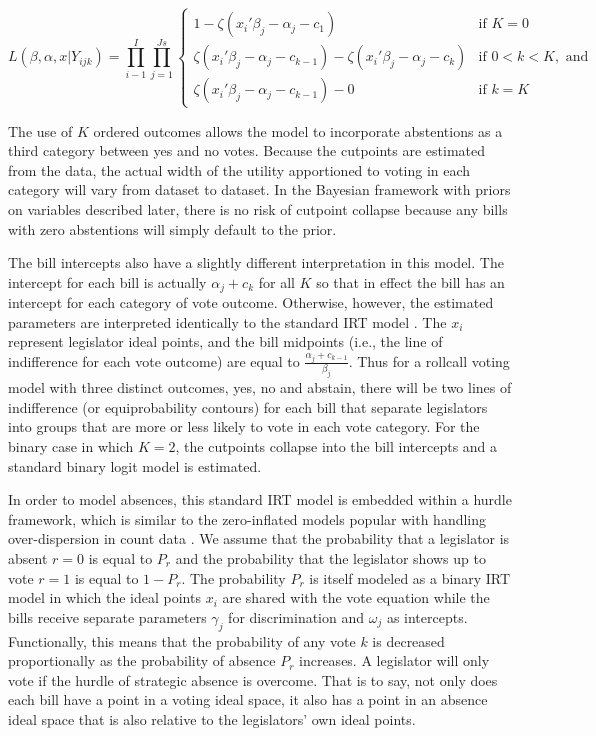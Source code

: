 					\[
	L(\beta,\alpha,x|Y_{ijk}) = \prod_{i-1}^{I} \prod_{j=1}^{Js}
	\begin{cases} 
	1 -  \zeta(x_{i}'\beta_j - \alpha_j - c_1) & \text{if } K = 0 \\
	\zeta(x_{i}'\beta_j - \alpha_j - c_{k-1}) - \zeta(x_{i}'\beta_j - \alpha_j - c_{k})       & \text{if } 0 < k < K, \text{ and} \\
	\zeta(x_{i}'\beta_j - \alpha_j - c_{k-1}) - 0 & \text{if } k=K
	\end{cases}
	\]
	
	The use of $K$ ordered outcomes allows the model to incorporate abstentions as a third category between yes and no votes. Because the cutpoints are estimated from the data, the actual width of the utility apportioned to voting in each category will vary from dataset to dataset. In the Bayesian framework with priors on variables described later, there is no risk of cutpoint collapse because any bills with zero abstentions will simply default to the prior.
	
	The bill intercepts also have a slightly different interpretation in this model. The intercept for each bill is actually $\alpha_j + c_k$ for all $K$ so that in effect the bill has an intercept for each category of vote outcome. Otherwise, however, the estimated parameters are interpreted identically to the standard IRT model \parencite{jackman2004}. The $x_i$ represent legislator ideal points, and the bill midpoints (i.e., the line of indifference for each vote outcome) are equal to $\frac{\alpha_j + c_{k-1}}{\beta_j}$. Thus for a rollcall voting model with three distinct outcomes, yes, no and abstain, there will be two lines of indifference (or equiprobability contours) for each bill that separate legislators into groups that are more or less likely to vote in each vote category. For the binary case in which $K=2$, the cutpoints collapse into the bill intercepts and a standard binary logit model is estimated.
	
	In order to model absences, this standard IRT model is embedded within a hurdle framework, which is similar to the zero-inflated models popular with handling over-dispersion in count data \parencite{zorn1998}. We assume that the probability that a legislator is absent $r=0$ is equal to $P_r$ and the probability that the legislator shows up to vote $r=1$ is equal to $1-P_r$. The probability $P_r$ is itself modeled as a binary IRT model in which the ideal points $x_i$ are shared with the vote equation while the bills receive separate parameters $\gamma_j$ for discrimination and $\omega_j$ as intercepts. Functionally, this means that the probability of any vote $k$ is decreased proportionally as the probability of absence $P_r$ increases. A legislator will only vote if the hurdle of strategic absence is overcome. That is to say, not only does each bill have a point in a voting ideal space, it also has a point in an absence ideal space that is also relative to the legislators' own ideal points.
	
